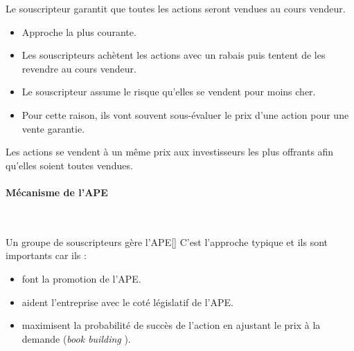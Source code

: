 \documentclass[10pt, french]{article}
\begin{document}
\begin{multicols*}{2}
\begin{definitionNOHFILLsub}
Le souscripteur garantit que toutes les actions seront vendues au cours vendeur.
\begin{itemize}
	\item	Approche la plus courante.
	\item	Les souscripteurs achètent les actions avec un rabais puis tentent de les revendre au cours vendeur.
	\item	Le souscripteur assume le risque qu'elles se vendent pour moins cher.
	\item	Pour cette raison, ils vont souvent sous-évaluer le prix d'une action pour une vente garantie.
\end{itemize}
\end{definitionNOHFILLsub}

\begin{definitionNOHFILLsub}
Les actions se vendent à un même prix aux investisseurs les plus offrants afin qu’elles soient toutes vendues.
\end{definitionNOHFILLsub}


\paragraph{Mécanisme de l'APE}\
\begin{definitionGENERAL}{Un groupe de souscripteurs gère l'APE}[]
C'est l'approche typique et ils sont importants car ils :
\begin{itemize}
	\item	font la promotion de l'APE.
	\item	aident l'entreprise avec le coté législatif de l'APE.
	\item	maximisent la probabilité de succès de l'action en ajustant le prix à la demande (\og \textit{book building} \fg{}).
\end{itemize}
\end{definitionGENERAL}


\end{multicols*}
\end{document}
